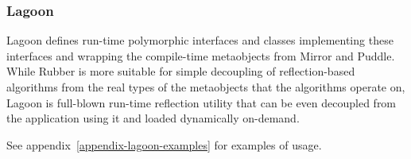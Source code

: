\subsubsection{Lagoon}

Lagoon defines run-time polymorphic interfaces and classes implementing these
interfaces and wrapping the compile-time metaobjects from Mirror and Puddle.
While Rubber is more suitable for simple decoupling of reflection-based
algorithms from the real types of the metaobjects that the algorithms
operate on, Lagoon is full-blown run-time reflection utility that can be
even decoupled from the application using it and loaded dynamically on-demand.

See appendix~\ref{appendix-lagoon-examples} for examples of usage.
